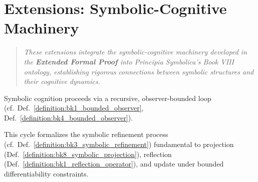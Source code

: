 \section{Extensions: Symbolic-Cognitive Machinery}
\label{sec:bk8_de_projectione_symbolica}
\begin{quote}
\textit{These extensions integrate the symbolic-cognitive machinery developed in the \textbf{Extended Formal Proof} into \textit{Principia Symbolica}'s Book VIII ontology, establishing rigorous connections between symbolic structures and their cognitive dynamics.}
\end{quote}
\begin{axiom}
\label{axiom:bk8_curvature_transformation}
Symbolic cognition proceeds via a recursive, observer-bounded loop (cf.~Def.~\ref{definition:bk1_bounded_observer}, Def.~\ref{definition:bk4_bounded_observer}).
\vspace{0.5em}
\begin{center}
\end{center}
This cycle formalizes the symbolic refinement process (cf.~Def.~\ref{definition:bk3_symbolic_refinement}) fundamental to projection (Def.~\ref{definition:bk8_symbolic_projection}), reflection (Def.~\ref{definition:bk1_reflection_operator}), and update under bounded differentiability constraints.
\end{axiom}
